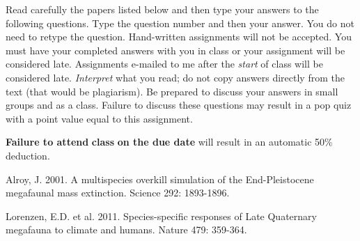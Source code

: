 \documentclass[11pt]{exam}
\begin{document}
Read carefully the papers listed below and then type your answers to the following questions.
Type the question number and then your answer. You do not need to retype the question. Hand-written
assignments will not be accepted. You must have your completed answers
with you in class or your assignment will be considered late. Assignments e-mailed to me after the \emph{start} of class will be
considered late. \emph{Interpret} what you read; do not copy answers directly from the text (that would
be plagiarism). Be prepared to discuss your answers in small groups and as a class. Failure
to discuss these questions may result in a pop quiz with a point value
equal to this assignment.

\textbf{Failure to attend} \textbf{class} \textbf{on the due date} will
result in an automatic 50\% deduction.

\begin{hangparas}{1.5em}{1}
Alroy, J. 2001. A multispecies overkill simulation of the
End-Pleistocene megafaunal mass extinction. Science 292: 1893-1896.

Lorenzen, E.D. et al. 2011. Species-specific responses of Late
Quaternary megafauna to climate and humans. Nature 479: 359-364. 
\end{hangparas}
\end{document}
